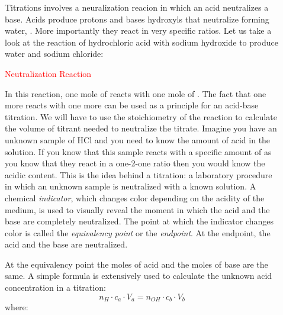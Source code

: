 \documentclass[main.tex]{subfiles}
\newcommand\chapterlabel{acids}
\begin{document}
\begin{description}
\item[] Titrations involves a neuralization reacion in which an acid neutralizes a base. Acids produce protons  and bases hydroxyls  that neutralize forming water, . More importantly they react in very specific ratios. Let us take a look at the reaction of hydrochloric acid with sodium hydroxide to produce water and sodium chloride:
\begin{center} \hspace{1cm} \textcolor{red}{Neutralization Reaction}\end{center}
In this reaction, one mole of  reacts with one mole of  . The fact that one more reacts with one more can be used as a principle for an acid-base titration. We will have to use the stoichiometry of the reaction to calculate the volume of titrant needed to neutralize the titrate. Imagine you have an unknown sample of HCl and you need to know the amount of acid in the solution. If you know that this sample reacts with a specific amount of  as you know that they react in a one-2-one ratio then you would know the acidic content. This is the idea behind a titration: a laboratory procedure in which an unknown sample is neutralized with a known solution. A chemical \emph{indicator}, which changes color depending on the acidity of the medium, is used to visually reveal the moment in which the acid and the base are completely neutralized. The point at which the indicator changes color is called the \emph{equivalency point} or the \emph{endpoint}. At the endpoint, the acid and the base are neutralized.

\item[] At the equivalency point the moles of acid and the moles of base are the same. A simple formula is extensively used to calculate the unknown acid concentration in a titration:
\begin{equation}
\boxed{n_{H}\cdot c_a\cdot V_a=n_{OH}\cdot c_b\cdot V_b }
\label{\chapterlabel:equation13}
 \end{equation} 
 where:
 

\end{description}
\end{document}
